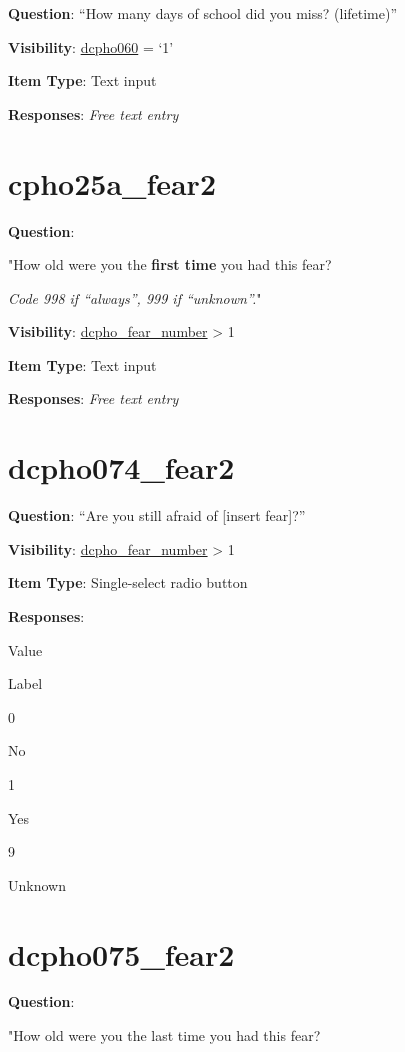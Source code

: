 \documentclass[]{book}
\begin{document}
\textbf{Question}: ``How many days of school did you miss? (lifetime)''

\textbf{Visibility}: \protect\hyperlink{dcpho060}{dcpho060} = `1'

\textbf{Item Type}: Text input

\textbf{Responses}: \emph{Free text entry}

\hypertarget{cpho25a_fear2}{%
\section{cpho25a\_fear2}\label{cpho25a_fear2}}

\textbf{Question}:

"How old were you the \textbf{first time} you had this fear?

\emph{Code 998 if ``always'', 999 if ``unknown''.}"

\textbf{Visibility}: \protect\hyperlink{dcpho_fear_number}{dcpho\_fear\_number} \textgreater{} 1

\textbf{Item Type}: Text input

\textbf{Responses}: \emph{Free text entry}

\hypertarget{dcpho074_fear2}{%
\section{dcpho074\_fear2}\label{dcpho074_fear2}}

\textbf{Question}: ``Are you still afraid of {[}insert fear{]}?''

\textbf{Visibility}: \protect\hyperlink{dcpho_fear_number}{dcpho\_fear\_number} \textgreater{} 1

\textbf{Item Type}: Single-select radio button

\textbf{Responses}:

Value

Label

0

No

1

Yes

9

Unknown

\hypertarget{dcpho075_fear2}{%
\section{dcpho075\_fear2}\label{dcpho075_fear2}}

\textbf{Question}:

"How old were you the last time you had this fear?
\end{document}
